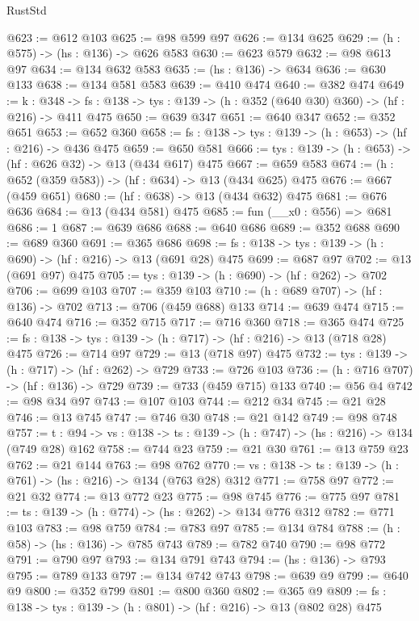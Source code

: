 \begin{lexlean}{RustStd}
\begin{coremodule}
{\begin{coremodule}
{{{{{{{{{@623 := @612 @103
@625 := @98 @599 @97
@626 := @134 @625
@629 := (h : @575) -> (hs : @136) -> @626 @583
@630 := @623 @579
@632 := @98 @613 @97
@634 := @134 @632 @583
@635 := (hs : @136) -> @634
@636 := @630 @133
@638 := @134 @581 @583
@639 := @410 @474
@640 := @382 @474
@649 := {k : @348} ->
  {fs : @138} -> {tys : @139} -> (h : @352 (@640 @30) @360) -> (hf : @216) -> @411 @475
@650 := @639 @347
@651 := @640 @347
@652 := @352 @651
@653 := @652 @360
@658 := {fs : @138} -> {tys : @139} -> (h : @653) -> (hf : @216) -> @436 @475
@659 := @650 @581
@666 := {tys : @139} -> (h : @653) -> (hf : @626 @32) -> @13 (@434 @617) @475
@667 := @659 @583
@674 := (h : @652 (@359 @583)) -> (hf : @634) -> @13 (@434 @625) @475
@676 := @667 (@459 @651)
@680 := (hf : @638) -> @13 (@434 @632) @475
@681 := @676 @636
@684 := @13 (@434 @581) @475
@685 := fun (__x0 : @556) => @681
@686 := 1
@687 := @639 @686
@688 := @640 @686
@689 := @352 @688
@690 := @689 @360
@691 := @365 @686
@698 := {fs : @138} -> {tys : @139} -> (h : @690) -> (hf : @216) -> @13 (@691 @28) @475
@699 := @687 @97
@702 := @13 (@691 @97) @475
@705 := {tys : @139} -> (h : @690) -> (hf : @262) -> @702
@706 := @699 @103
@707 := @359 @103
@710 := (h : @689 @707) -> (hf : @136) -> @702
@713 := @706 (@459 @688) @133
@714 := @639 @474
@715 := @640 @474
@716 := @352 @715
@717 := @716 @360
@718 := @365 @474
@725 := {fs : @138} -> {tys : @139} -> (h : @717) -> (hf : @216) -> @13 (@718 @28) @475
@726 := @714 @97
@729 := @13 (@718 @97) @475
@732 := {tys : @139} -> (h : @717) -> (hf : @262) -> @729
@733 := @726 @103
@736 := (h : @716 @707) -> (hf : @136) -> @729
@739 := @733 (@459 @715) @133
@740 := @56 @4
@742 := @98 @34 @97
@743 := @107 @103
@744 := @212 @34
@745 := @21 @28
@746 := @13 @745
@747 := @746 @30
@748 := @21 @142
@749 := @98 @748
@757 := {t : @94} -> {vs : @138} -> {ts : @139} -> (h : @747) -> (hs : @216) -> @134 (@749 @28) @162
@758 := @744 @23
@759 := @21 @30
@761 := @13 @759 @23
@762 := @21 @144
@763 := @98 @762
@770 := {vs : @138} -> {ts : @139} -> (h : @761) -> (hs : @216) -> @134 (@763 @28) @312
@771 := @758 @97
@772 := @21 @32
@774 := @13 @772 @23
@775 := @98 @745
@776 := @775 @97
@781 := {ts : @139} -> (h : @774) -> (hs : @262) -> @134 @776 @312
@782 := @771 @103
@783 := @98 @759
@784 := @783 @97
@785 := @134 @784
@788 := (h : @58) -> (hs : @136) -> @785 @743
@789 := @782 @740
@790 := @98 @772
@791 := @790 @97
@793 := @134 @791 @743
@794 := (hs : @136) -> @793
@795 := @789 @133
@797 := @134 @742 @743
@798 := @639 @9
@799 := @640 @9
@800 := @352 @799
@801 := @800 @360
@802 := @365 @9
@809 := {fs : @138} -> {tys : @139} -> (h : @801) -> (hf : @216) -> @13 (@802 @28) @475
}}}}}}}}}
\end{coremodule}}
\end{coremodule}
\end{lexlean}
